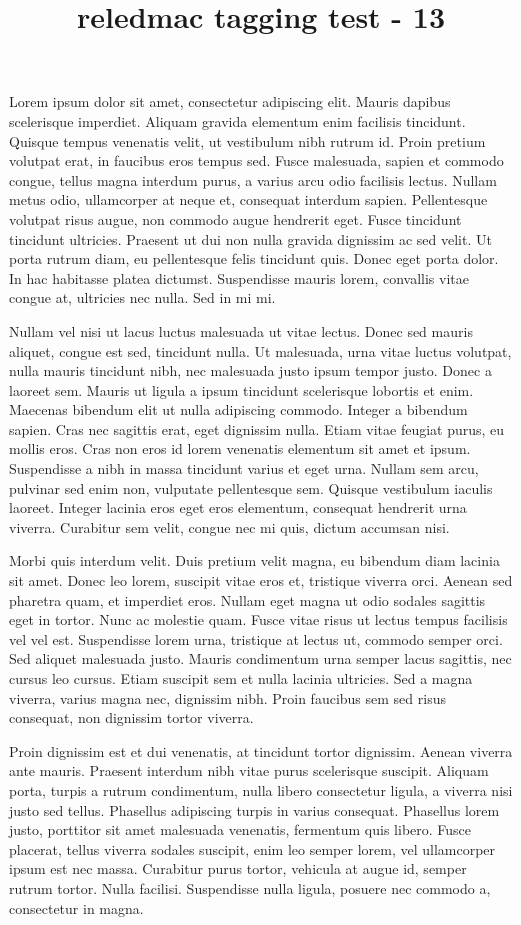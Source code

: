 \documentclass[twoside]{article}
\title{reledmac tagging test - 13}
\begin{document}
\beginnumbering
\autopar

Lorem ipsum dolor sit amet, consectetur adipiscing elit. Mauris dapibus scelerisque imperdiet. Aliquam gravida elementum enim facilisis tincidunt. Quisque tempus venenatis velit, ut vestibulum nibh rutrum id. Proin pretium volutpat erat, in faucibus eros tempus sed. Fusce malesuada, sapien et commodo congue, tellus magna interdum purus, a varius arcu odio facilisis lectus. Nullam metus odio, ullamcorper at neque et, consequat interdum sapien. Pellentesque volutpat risus augue, non commodo augue hendrerit eget. Fusce tincidunt tincidunt ultricies. Praesent ut dui non nulla gravida dignissim ac sed velit. Ut porta rutrum diam, eu pellentesque felis tincidunt quis. Donec eget porta dolor. In hac habitasse platea dictumst. Suspendisse mauris lorem, convallis vitae congue at, ultricies nec nulla. Sed in mi mi.

Nullam vel nisi ut lacus luctus malesuada ut vitae lectus. Donec sed mauris aliquet, congue est sed, tincidunt nulla. Ut malesuada, urna vitae luctus volutpat, nulla mauris tincidunt nibh, nec malesuada justo ipsum tempor justo. Donec a laoreet sem. Mauris ut ligula a ipsum tincidunt scelerisque lobortis et enim. Maecenas bibendum elit ut nulla adipiscing commodo. Integer a bibendum sapien. Cras nec sagittis erat, eget dignissim nulla. Etiam vitae feugiat purus, eu mollis eros. Cras non eros id lorem venenatis elementum sit amet et ipsum. Suspendisse a nibh in massa tincidunt varius et eget urna. Nullam sem arcu, pulvinar sed enim non, vulputate pellentesque sem. Quisque vestibulum iaculis laoreet. Integer lacinia eros eget eros elementum, consequat hendrerit urna viverra. Curabitur sem velit, congue nec mi quis, dictum accumsan nisi.

Morbi quis interdum velit. Duis pretium velit magna, eu bibendum diam lacinia sit amet. Donec leo lorem, suscipit vitae eros et, tristique viverra orci. Aenean sed pharetra quam, et imperdiet eros. Nullam eget magna ut odio sodales sagittis eget in tortor. Nunc ac molestie quam. Fusce vitae risus ut lectus tempus facilisis vel vel est. Suspendisse lorem urna, tristique at lectus ut, commodo semper orci. Sed aliquet malesuada justo. Mauris condimentum urna semper lacus sagittis, nec cursus leo cursus. Etiam suscipit sem et nulla lacinia ultricies. Sed a magna viverra, varius magna nec, dignissim nibh. Proin faucibus sem sed risus consequat, non dignissim tortor viverra.

Proin dignissim est et dui venenatis, at tincidunt tortor dignissim. Aenean viverra ante mauris. Praesent interdum nibh vitae purus scelerisque suscipit. Aliquam porta, turpis a rutrum condimentum, nulla libero consectetur ligula, a viverra nisi justo sed tellus. Phasellus adipiscing turpis in varius consequat. Phasellus lorem justo, porttitor sit amet malesuada venenatis, fermentum quis libero. Fusce placerat, tellus viverra sodales suscipit, enim leo semper lorem, vel ullamcorper ipsum est nec massa. Curabitur purus tortor, vehicula at augue id, semper rutrum tortor. Nulla facilisi. Suspendisse nulla ligula, posuere nec commodo a, consectetur in magna.
\end{document}
